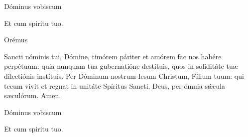


\rubric{\Vbar} Dóminus vobiscum

\rubric{\Rbar} Et cum spiritu tuo.

Orémus

Sancti nóminis tui, Dómine, timórem páriter et amórem fac nos habére perpétuum: quia nunquam tua gubernatióne destítuis, quos in soliditáte tuæ dilectiónis instítuis.
Per Dóminum nostrum Iesum Christum, Fílium tuum: qui tecum vivit et regnat in unitáte Spíritus Sancti, Deus, per ómnia sǽcula sæculórum. \rubric{\Rbar} Amen.

\rubric{\Vbar} Dóminus vobiscum

\rubric{\Rbar} Et cum spiritu tuo.
